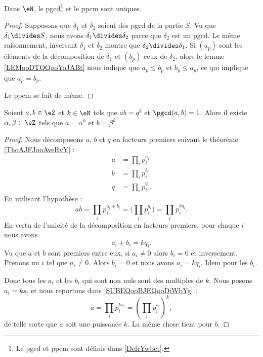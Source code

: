 \begin{lemma}       \label{LEMooBJVJooFyuFeN}
    Dans \( \eN\), le pgcd\footnote{Le pgcd et ppcm sont définis dans \ref{DefrYwbct}.} et le ppcm sont uniques.
\end{lemma}

\begin{proof}
    Supposons que \( \delta_1\) et \( \delta_2\) soient des pgcd de la partie \( S\). Vu que \( \delta_1\divides S\), nous avons \( \delta_1\divides \delta_2\) parce que \( \delta_2\) est un pgcd. Le même raisonnement, inversant \( \delta_1\) et \( \delta_2\) montre que \( \delta_2\divides \delta_1\). Si \( (a_p)\) sont les éléments de la décomposition de \( \delta_1\) et \( (b_p)\) ceux de \( \delta_2\), alors le lemme \ref{LEMooDTQQooYoJABt} nous indique que \( a_p\leq b_p\) et \( b_p\leq a_p\), ce qui implique que \( a_p=b_p\).

    Le ppcm se fait de même.
\end{proof}

\begin{lemma}        \label{LEMooEVIZooPAkQZW}
    Soient \( a,b\in \eZ\) et \( k\in \eN\) tels que \( ab=q^k\) et \( \pgcd(a,b)=1\). Alors il existe \( \alpha,\beta\in\eZ\) tels que \( a=\alpha^k\) et \( b=\beta^k\).
\end{lemma}

\begin{proof}
    Nous décomposons \( a\), \( b\) et \( q\) en facteurs premiers suivant le théorème \ref{ThoAJFJooAveRvY} :
    \begin{subequations}
        \begin{align}
            a&=\prod_ip_i^{a_i}     \label{SUBEQooBJEQooDiWbYg}\\
            b&=\prod_ip_i^{b_i}\\
            q&=\prod_{i}p_i^{q_i}.
        \end{align}
    \end{subequations}
    En utilisant l'hypothèse :
    \begin{equation}
        ab=\prod_ip_i^{a_i+b_i}=\big( \prod_ip_i^{q_i} \big)=\prod_ip_i^{kq_i}.
    \end{equation}
    En vertu de l'unicité de la décomposition en facteurs premiers, pour chaque \( i\) nous avons
    \begin{equation}
        a_i+b_i=kq_i.
    \end{equation}
    Vu que \( a\) et \( b\) sont premiers entre eux, si \( a_i\neq0\) alors \( b_i=0\) et inversement. Prenons un \( i\) tel que \( a_i\neq 0\). Alors \( b_i=0\) et nous avons \( a_i=kq_i\). Idem pour les \( b_i\).

    Donc tous les \( a_i\) et les \( b_i\) qui sont non nuls sont des multiples de \( k\). Nous posons \( a_i=ks_i\) et nous reportons dans \eqref{SUBEQooBJEQooDiWbYg} :
    \begin{equation}
        a=\prod_ip_i^{ks_i}=(\prod_ip_i^{s_i})^k,
    \end{equation}
    de telle sorte que \( a\) soit une puissance \( k\)\ieme. La même chose tient pour \( b\).
\end{proof}

